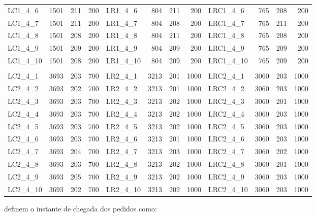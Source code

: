 \begin{table}[H]
\begin{tabular}{lrrr|lrrr|lrrr}
        LC1\_4\_6  & 1501 & 211 & 200 & LR1\_4\_6  &  804 & 211 &  200 & LRC1\_4\_6  &  765 & 208 &  200\\
        LC1\_4\_7  & 1501 & 211 & 200 & LR1\_4\_7  &  804 & 208 &  200 & LRC1\_4\_7  &  765 & 211 &  200\\
        LC1\_4\_8  & 1501 & 208 & 200 & LR1\_4\_8  &  804 & 211 &  200 & LRC1\_4\_8  &  765 & 208 &  200\\
        LC1\_4\_9  & 1501 & 209 & 200 & LR1\_4\_9  &  804 & 209 &  200 & LRC1\_4\_9  &  765 & 209 &  200\\
        LC1\_4\_10 & 1501 & 208 & 200 & LR1\_4\_10 &  804 & 209 &  200 & LRC1\_4\_10 &  765 & 209 &  200\\
                   &      &     &     &            &      &     &      &             &      &     &     \\
        LC2\_4\_1  & 3693 & 203 & 700 & LR2\_4\_1  & 3213 & 201 & 1000 & LRC2\_4\_1  & 3060 & 203 & 1000\\
        LC2\_4\_2  & 3693 & 202 & 700 & LR2\_4\_2  & 3213 & 201 & 1000 & LRC2\_4\_2  & 3060 & 203 & 1000\\
        LC2\_4\_3  & 3693 & 203 & 700 & LR2\_4\_3  & 3213 & 202 & 1000 & LRC2\_4\_3  & 3060 & 201 & 1000\\
        LC2\_4\_4  & 3693 & 203 & 700 & LR2\_4\_4  & 3213 & 202 & 1000 & LRC2\_4\_4  & 3060 & 203 & 1000\\
        LC2\_4\_5  & 3693 & 203 & 700 & LR2\_4\_5  & 3213 & 202 & 1000 & LRC2\_4\_5  & 3060 & 203 & 1000\\
        LC2\_4\_6  & 3693 & 203 & 700 & LR2\_4\_6  & 3213 & 201 & 1000 & LRC2\_4\_6  & 3060 & 203 & 1000\\
        LC2\_4\_7  & 3693 & 204 & 700 & LR2\_4\_7  & 3213 & 203 & 1000 & LRC2\_4\_7  & 3060 & 202 & 1000\\
        LC2\_4\_8  & 3693 & 203 & 700 & LR2\_4\_8  & 3213 & 202 & 1000 & LRC2\_4\_8  & 3060 & 201 & 1000\\
        LC2\_4\_9  & 3693 & 205 & 700 & LR2\_4\_9  & 3213 & 202 & 1000 & LRC2\_4\_9  & 3060 & 203 & 1000\\
        LC2\_4\_10 & 3693 & 202 & 700 & LR2\_4\_10 & 3213 & 202 & 1000 & LRC2\_4\_10 & 3060 & 203 & 1000\\
    \bottomrule
  \end{tabular}
\end{table}

\textcite{pureza_laporte_waiting_2008} definem o instante de chegada dos
pedidos como:

